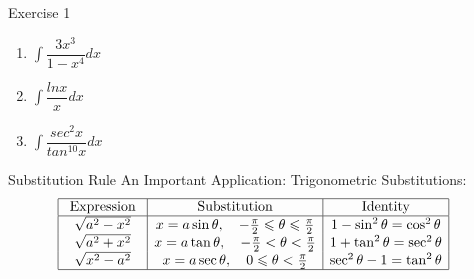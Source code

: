 \begin{frame}{Exercise 1}
    \begin{enumerate}
        \item$\int\dfrac{3x^3}{1-x^4}dx$
              \bigskip
        \item $\int\dfrac{ln x}{x}dx$
              \bigskip
        \item $\int\dfrac{sec^2 x}{tan^{10} x}dx$
    \end{enumerate}
\end{frame}


\begin{frame}{Substitution Rule}
    An Important Application: Trigonometric Substitutions:
    $$
        \begin{aligned}
             & \begin{array}{|c|c|c|}
                   \hline \text { Expression } & \text { Substitution }                                                        & \text { Identity }                  \\
                   \hline \sqrt{a^{2}-x^{2}}   & x=a \sin \theta, \quad-\frac{\pi}{2} \leqslant \theta \leqslant \frac{\pi}{2} & 1-\sin ^{2} \theta=\cos ^{2} \theta \\
                   \sqrt{a^{2}+x^{2}}          & x=a \tan \theta, \quad-\frac{\pi}{2}<\theta<\frac{\pi}{2}                     & 1+\tan ^{2} \theta=\sec ^{2} \theta \\
                   \sqrt{x^{2}-a^{2}}          & x=a \sec \theta, \quad 0 \leqslant \theta<\frac{\pi}{2}                       & \sec ^{2} \theta-1=\tan ^{2} \theta \\
                   \hline
               \end{array}
        \end{aligned}
    $$
\end{frame}


